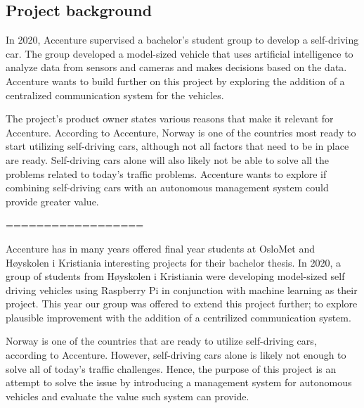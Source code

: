 \subsection{Project background}
In 2020, Accenture supervised a bachelor's student group to develop a self-driving car. The group developed a model-sized vehicle that uses artificial intelligence to analyze data from sensors and cameras and makes decisions based on the data. Accenture wants to build further on this project by exploring the addition of a centralized communication system for the vehicles.

The project's product owner states various reasons that make it relevant for Accenture. According to Accenture, Norway is one of the countries most ready to start utilizing self-driving cars, although not all factors that need to be in place are ready. Self-driving cars alone will also likely not be able to solve all the problems related to today's traffic problems. Accenture wants to explore if combining self-driving cars with an autonomous management system could provide greater value. 


==================

Accenture has in many years offered final year students at OsloMet and Høyskolen i Kristiania interesting projects for their bachelor thesis. In 2020, a group of students from Høyskolen i Kristiania were developing model-sized self driving vehicles using Raspberry Pi in conjunction with machine learning as their project. This year our group was offered to extend this project further; to explore plausible improvement with the addition of a centrilized communication system.

Norway is one of the countries that are ready to utilize self-driving cars, according to Accenture. However, self-driving cars alone is likely not enough to solve all of today's traffic challenges. Hence, the purpose of this project is an attempt to solve the issue by introducing a management system for autonomous vehicles and evaluate the value such system can provide.